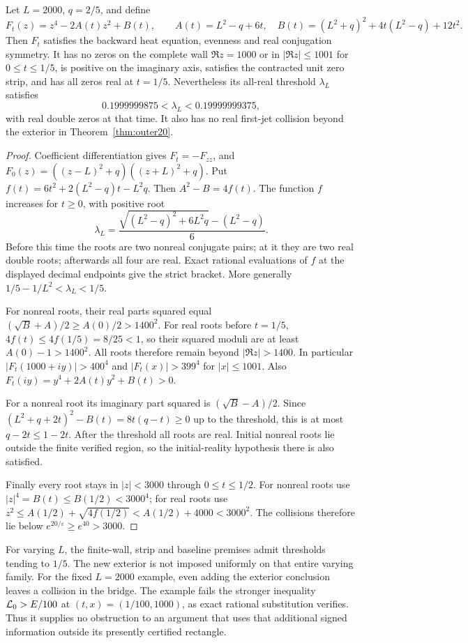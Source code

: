 \begin{proposition}
\label{prop:remote-control}
Let $L=2000$, $q=2/5$, and define
\[
 F_t(z)=z^4-2A(t)z^2+B(t),\qquad
 A(t)=L^2-q+6t,\quad
 B(t)=(L^2+q)^2+4t(L^2-q)+12t^2.
\]
Then $F_t$ satisfies the backward heat equation, evenness and
real conjugation symmetry. It has no zeros on the complete wall
$\Re z=1000$ or in $|\Re z|\le1001$ for $0\le t\le1/5$,
is positive on the imaginary axis, satisfies the contracted unit
zero strip, and has all zeros real at $t=1/5$.
Nevertheless its all-real threshold $\lambda_L$ satisfies
\[
 0.1999999875<\lambda_L<0.19999999375,
\]
with real double zeros at that time. It also has no real
first-jet collision beyond the exterior in Theorem~\ref{thm:outer20}.
\end{proposition}
\begin{proof}
Coefficient differentiation gives $F_t=-F_{zz}$, and
$F_0(z)=((z-L)^2+q)((z+L)^2+q)$.
Put $f(t)=6t^2+2(L^2-q)t-L^2q$. Then $A^2-B=4f(t)$.
The function $f$ increases for $t\ge0$, with positive root
\[
 \lambda_L=
 \frac{\sqrt{(L^2-q)^2+6L^2q}-(L^2-q)}6.
\]
Before this time the roots are two nonreal conjugate pairs;
at it they are two real double roots; afterwards all four are real.
Exact rational evaluations of $f$ at the displayed decimal endpoints
give the strict bracket. More generally
$1/5-1/L^2<\lambda_L<1/5$.

For nonreal roots, their real parts squared equal
$(\sqrt B+A)/2\ge A(0)/2>1400^2$.
For real roots before $t=1/5$,
$4f(t)\le4f(1/5)=8/25<1$, so their squared moduli are at
least $A(0)-1>1400^2$. All roots therefore remain beyond
$|\Re z|>1400$. In particular
$|F_t(1000+iy)|>400^4$ and
$|F_t(x)|>399^4$ for $|x|\le1001$.
Also $F_t(iy)=y^4+2A(t)y^2+B(t)>0$.

For a nonreal root its imaginary part squared is
$(\sqrt B-A)/2$. Since
$(L^2+q+2t)^2-B(t)=8t(q-t)\ge0$ up to the threshold,
this is at most $q-2t\le1-2t$. After the threshold
all roots are real. Initial nonreal roots lie outside the
finite verified region, so the initial-reality hypothesis there
is also satisfied.

Finally every root stays in $|z|<3000$ through $0\le t\le1/2$.
For nonreal roots use $|z|^4=B(t)\le B(1/2)<3000^4$;
for real roots use
$z^2\le A(1/2)+\sqrt{4f(1/2)}<A(1/2)+4000<3000^2$.
The collisions therefore lie below
$e^{20/\varepsilon}\ge e^{40}>3000$.
\end{proof}

For varying $L$, the finite-wall, strip and baseline premises admit
thresholds tending to $1/5$. The new exterior is not imposed uniformly
on that entire varying family. For the fixed $L=2000$ example,
even adding the exterior conclusion leaves a collision in the bridge.
The example fails the stronger inequality $\mathcal L_0>E/100$ at
$(t,x)=(1/100,1000)$, as exact rational substitution verifies.
Thus it supplies no obstruction to an argument that uses that
additional signed information outside its presently certified rectangle.


